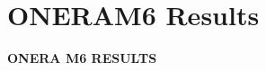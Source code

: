 \section[ONERAM6]{\textbf{ONERAM6 Results}}


\begin{frame}[plain]
    \centering
    \vfill

    {\LARGE\bfseries ONERA M6 RESULTS}

    \vfill
\end{frame}


